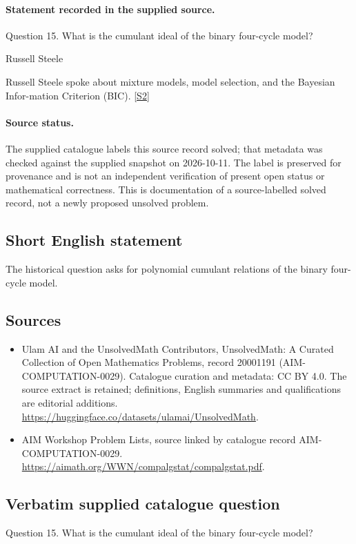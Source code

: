 \documentclass[11pt]{article}
\begin{document}
\paragraph{Statement recorded in the supplied source.}
Question 15. What is the cumulant ideal of the binary four-cycle model?

Russell Steele

Russell Steele spoke about mixture models, model selection, and the Bayesian Infor-mation Criterion (BIC). \href{https://aimath.org/WWN/compalgstat/compalgstat.pdf}{[S2]}
\paragraph{Source status.}
The supplied catalogue labels this source record solved; that metadata was checked against the supplied snapshot on 2026-10-11. The label is preserved for provenance and is not an independent verification of present open status or mathematical correctness. This is documentation of a source-labelled solved record, not a newly proposed unsolved problem.
\subsection{Short English statement}
The historical question asks for polynomial cumulant relations of the binary four-cycle model.
\subsection{Sources}
\begin{itemize}
\item[S1] Ulam AI and the UnsolvedMath Contributors, UnsolvedMath: A Curated Collection of Open Mathematics Problems, record 20001191 (AIM-COMPUTATION-0029). Catalogue curation and metadata: CC BY 4.0. The source extract is retained; definitions, English summaries and qualifications are editorial additions.
\url{https://huggingface.co/datasets/ulamai/UnsolvedMath}.
\item[S2] AIM Workshop Problem Lists, source linked by catalogue record AIM-COMPUTATION-0029.
\url{https://aimath.org/WWN/compalgstat/compalgstat.pdf}.
\end{itemize}
\subsection{Verbatim supplied catalogue question}
Question 15. What is the cumulant ideal of the binary four-cycle model?
\end{document}
